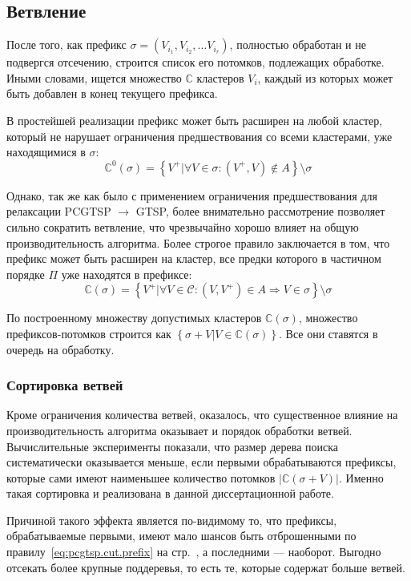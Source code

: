 
\subsection{Ветвление}
\label{sec:pgstcp.branch}

После того, как префикс
$\sigma=(V_{i_1}, V_{i_2}, \dots V_{i_r})$,
полностью обработан и не подвергся отсечению,
строится список его потомков,
подлежащих обработке.
Иными словами, ищется множество $\mathbb C$
кластеров $V_i$,
каждый из которых может быть добавлен в конец
текущего префикса.

В простейшей реализации префикс может быть
расширен на любой кластер,
который не нарушает ограничения предшествования
со всеми кластерами, уже находящимися в $\sigma$:
$$
\mathbb C^0(\sigma) =
  \left\{
    V^+|
      \forall V \in \sigma: (V^+, V) \notin A
  \right\}
  \setminus \sigma
$$

Однако, так же как было с применением ограничения предшествования
для релаксации PCGTSP $\to$ GTSP,
более внимательно рассмотрение позволяет
сильно сократить ветвление,
что чрезвычайно хорошо влияет
на общую производительность алгоритма.
Более строгое правило заключается в том,
что префикс может быть расширен на кластер,
все предки которого в частичном порядке $\Pi$
уже находятся в префиксе:
$$
\mathbb C(\sigma)=
  \left\{
    V^+|
    \forall V \in \mathcal C: (V, V^+)\in A \Rightarrow V \in \sigma
  \right\}
  \setminus \sigma
$$

По построенному множеству допустимых кластеров $\mathbb C(\sigma)$,
множество префиксов-потомков строится как
$\left\{\sigma + V| V \in \mathbb C(\sigma)\right\}$.
Все они ставятся в очередь на обработку.

\subsubsection{Сортировка ветвей}

Кроме ограничения количества ветвей,
оказалось,
что существенное влияние на производительность
алгоритма оказывает и порядок обработки ветвей.
Вычислительные эксперименты показали,
что размер дерева поиска систематически
оказывается меньше,
если первыми обрабатываются префиксы,
которые сами имеют наименьшее количество потомков
$|\mathbb C(\sigma+V)|$.
Именно такая сортировка и реализована
в данной диссертационной работе.

Причиной такого эффекта является по-видимому то,
что префиксы, обрабатываемые первыми,
имеют мало шансов быть отброшенными
по правилу~\eqref{eq:pcgtsp.cut.prefix}
на стр.~\pageref{eq:pcgtsp.cut.prefix},
а последними --- наоборот.
Выгодно отсекать более крупные поддеревья,
то есть те, которые содержат больше ветвей.

